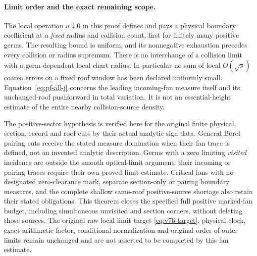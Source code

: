 \paragraph{Limit order and the exact remaining scope.}
The local operation $u\downarrow0$ in this proof defines and
pays a physical boundary coefficient at a \emph{fixed} radius
and collision count, first for finitely many positive germs.
The resulting bound is uniform, and its nonnegative exhaustion
precedes every collision or radius supremum.  There is no
interchange of a collision limit with a germ-dependent local
chart radius.  In particular no sum of local
$O(\sqrt{s})$ coarea errors on a fixed roof window has been
declared uniformly small.  Equation~\eqref{eq:pf-all-j} concerns
the leading incoming-fan measure itself and its unchanged-roof
pushforward in total variation.  It is not an essential-height
estimate of the entire nearby collision-source density.

The positive-sector hypothesis is verified here for the original
finite physical, section, record and roof cuts by their actual
analytic sign data.  General Borel pairing cuts receive the
stated measure domination when their fan trace is defined, not
an invented analytic description.  Germs with a zero limiting
\emph{visited} incidence are outside the smooth optical-limit
argument; their incoming or pairing traces require their own
proved limit estimate.  Critical fans with no designated
zero-clearance mark, separate section-only or pairing boundary
measures, and the complete shallow same-roof positive-source
shortage also retain their stated obligations.  This theorem
closes the specified full positive marked-fan budget, including
simultaneous unvisited and section corners, without deleting
those sources.  The original raw local limit target
\eqref{eq:v76-target}, physical clock, exact arithmetic factor,
conditional normalization and original order of outer limits
remain unchanged and are not asserted to be completed by this
fan estimate.
